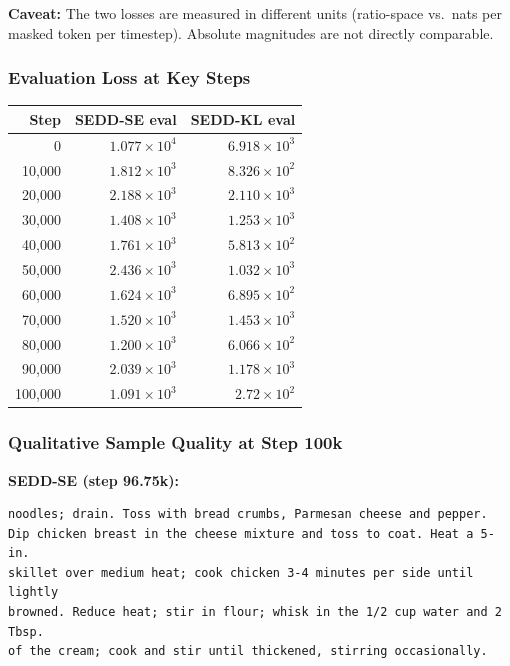 \documentclass[11pt,a4paper]{article}
\begin{document}
\textbf{Caveat:} The two losses are measured in different units (ratio-space vs.\ nats per masked token per timestep). Absolute magnitudes are not directly comparable.

\subsubsection*{Evaluation Loss at Key Steps}

\begin{center}
\begin{tabular}{rrr}
\toprule
Step & SEDD-SE eval & SEDD-KL eval \\
\midrule
0       & $1.077\times10^4$ & $6.918\times10^3$ \\
10,000  & $1.812\times10^3$ & $8.326\times10^2$ \\
20,000  & $2.188\times10^3$ & $2.110\times10^3$ \\
30,000  & $1.408\times10^3$ & $1.253\times10^3$ \\
40,000  & $1.761\times10^3$ & $5.813\times10^2$ \\
50,000  & $2.436\times10^3$ & $1.032\times10^3$ \\
60,000  & $1.624\times10^3$ & $6.895\times10^2$ \\
70,000  & $1.520\times10^3$ & $1.453\times10^3$ \\
80,000  & $1.200\times10^3$ & $6.066\times10^2$ \\
90,000  & $2.039\times10^3$ & $1.178\times10^3$ \\
100,000 & $1.091\times10^3$ & $2.72\times10^2$ \\
\bottomrule
\end{tabular}
\end{center}

\subsubsection*{Qualitative Sample Quality at Step 100k}

\textbf{SEDD-SE (step 96.75k):}
\begin{lstlisting}
noodles; drain. Toss with bread crumbs, Parmesan cheese and pepper.
Dip chicken breast in the cheese mixture and toss to coat. Heat a 5-in.
skillet over medium heat; cook chicken 3-4 minutes per side until lightly
browned. Reduce heat; stir in flour; whisk in the 1/2 cup water and 2 Tbsp.
of the cream; cook and stir until thickened, stirring occasionally.
\end{lstlisting}
\end{document}
